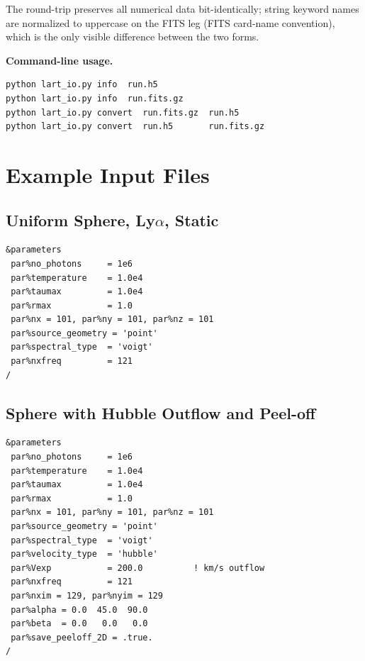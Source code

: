 \documentclass[english,a4paper]{my_memo}
\begin{document}
The round-trip preserves all numerical data bit-identically; string
keyword names are normalized to uppercase on the FITS leg (FITS card-name
convention), which is the only visible difference between the two forms.

\smallskip\noindent\textbf{Command-line usage.}

\begin{lstlisting}[language=bash]
python lart_io.py info  run.h5
python lart_io.py info  run.fits.gz
python lart_io.py convert  run.fits.gz  run.h5
python lart_io.py convert  run.h5       run.fits.gz
\end{lstlisting}

\section{Example Input Files}
\label{sec:examples}

\subsection{Uniform Sphere, Ly$\alpha$, Static}

\begin{lstlisting}
&parameters
 par%no_photons     = 1e6
 par%temperature    = 1.0e4
 par%taumax         = 1.0e4
 par%rmax           = 1.0
 par%nx = 101, par%ny = 101, par%nz = 101
 par%source_geometry = 'point'
 par%spectral_type  = 'voigt'
 par%nxfreq         = 121
/
\end{lstlisting}

\subsection{Sphere with Hubble Outflow and Peel-off}

\begin{lstlisting}
&parameters
 par%no_photons     = 1e6
 par%temperature    = 1.0e4
 par%taumax         = 1.0e4
 par%rmax           = 1.0
 par%nx = 101, par%ny = 101, par%nz = 101
 par%source_geometry = 'point'
 par%spectral_type  = 'voigt'
 par%velocity_type  = 'hubble'
 par%Vexp           = 200.0          ! km/s outflow
 par%nxfreq         = 121
 par%nxim = 129, par%nyim = 129
 par%alpha = 0.0  45.0  90.0
 par%beta  = 0.0   0.0   0.0
 par%save_peeloff_2D = .true.
/
\end{lstlisting}
\end{document}
